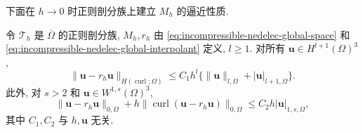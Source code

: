 下面在 $h\to0$ 时正则剖分族上建立 $M_h$ 的逼近性质.

\begin{Theorem}\label{thm:incompressible-nedelec-approximation}
令 $\mathcal T_h$ 是 $\overline\Omega$ 的正则剖分族,
$M_h,r_h$ 由
\eqref{eq:incompressible-nedelec-global-space} 和
\eqref{eq:incompressible-nedelec-global-interpolant}
定义, $l\geq1$. 对所有 $\mathbf u\in H^{l+1}(\Omega)^3$,
\begin{equation}\label{eq:incompressible-nedelec-hcurl-approximation}
\|\mathbf u-r_h\mathbf u\|_{H(\operatorname{curl};\Omega)}
\leq C_1h^l\{\|\mathbf u\|_{l,\Omega}
+|\mathbf u|_{l+1,\Omega}\}.
\end{equation}
此外, 对 $s>2$ 和 $\mathbf u\in W^{1,s}(\Omega)^3$,
\begin{equation}\label{eq:incompressible-nedelec-stability}
\|\mathbf u-r_h\mathbf u\|_{0,\Omega}
+h\|\operatorname{curl}(\mathbf u-r_h\mathbf u)\|_{0,\Omega}
\leq C_2h|\mathbf u|_{1,s,\Omega},
\end{equation}
其中 $C_1,C_2$ 与 $h,\mathbf u$ 无关.
\end{Theorem}

